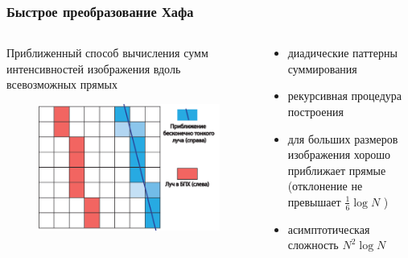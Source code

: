 \documentclass[12pt]{beamer}
\begin{document}
\begin{frame}
\frametitle{Быстрое преобразование Хафа}
\begin{columns}[T,onlytextwidth]
  \hspace*{-0.5cm}
  \begin{column}{0.65\textwidth}
  Приближенный способ вычисления сумм интенсивностей изображения вдоль всевозможных прямых
  \begin{figure}
    \includegraphics[width=1\textwidth]{fht}
  \end{figure}
  \end{column}
  \begin{column}{0.45\textwidth}
  \begin{itemize}
    \item диадические паттерны суммирования
    \item рекурсивная процедура построения
    \item для больших размеров изображения хорошо приближает прямые (отклонение не превышает  $\frac 1 6 \log N$ ) %
    \item асимптотическая сложность $N^2 \log N$
  \end{itemize}
  \end{column}
\end{columns}

\end{frame}
\end{document}
